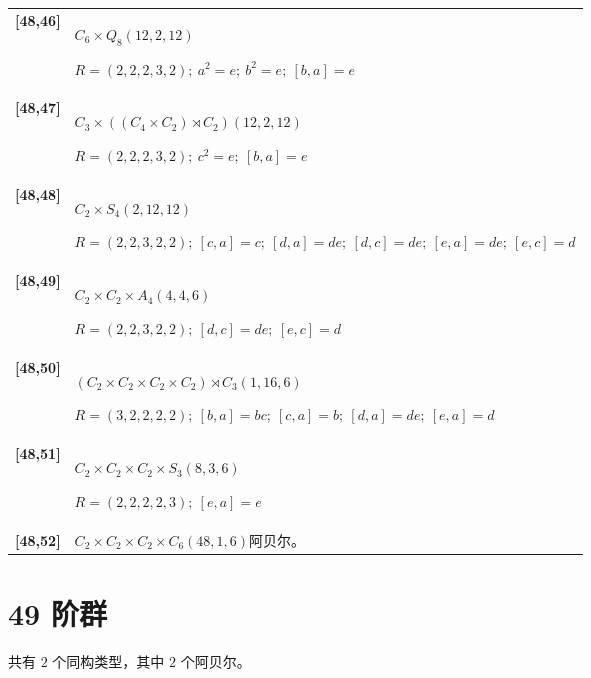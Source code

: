 \documentclass[UTF8,fontset=fandol,11pt,a4paper]{ctexart}
\begin{document}
\begin{longtable}{@{}p{17mm}>{\raggedright\arraybackslash}p{141mm}@{}}
\textbf{[48,46]} & $C_{6}\times Q_{8}$\quad $(12,2,12)$\par\(R=(2,2,2,3,2);\allowbreak\ a^{2}=e;\allowbreak\ b^{2}=e;\allowbreak\ [b,a]=e\)\\[3pt]

\textbf{[48,47]} & $C_{3}\times ((C_{4}\times C_{2})\rtimes C_{2})$\quad $(12,2,12)$\par\(R=(2,2,2,3,2);\allowbreak\ c^{2}=e;\allowbreak\ [b,a]=e\)\\[3pt]

\textbf{[48,48]} & $C_{2}\times S_{4}$\quad $(2,12,12)$\par\(R=(2,2,3,2,2);\allowbreak\ [c,a]=c;\allowbreak\ [d,a]=de;\allowbreak\ [d,c]=de;\allowbreak\ [e,a]=de;\allowbreak\ [e,c]=d\)\\[3pt]

\textbf{[48,49]} & $C_{2}\times C_{2}\times A_{4}$\quad $(4,4,6)$\par\(R=(2,2,3,2,2);\allowbreak\ [d,c]=de;\allowbreak\ [e,c]=d\)\\[3pt]

\textbf{[48,50]} & $(C_{2}\times C_{2}\times C_{2}\times C_{2})\rtimes C_{3}$\quad $(1,16,6)$\par\(R=(3,2,2,2,2);\allowbreak\ [b,a]=bc;\allowbreak\ [c,a]=b;\allowbreak\ [d,a]=de;\allowbreak\ [e,a]=d\)\\[3pt]

\textbf{[48,51]} & $C_{2}\times C_{2}\times C_{2}\times S_{3}$\quad $(8,3,6)$\par\(R=(2,2,2,2,3);\allowbreak\ [e,a]=e\)\\[3pt]

\textbf{[48,52]} & $C_{2}\times C_{2}\times C_{2}\times C_{6}$\quad $(48,1,6)$\quad 阿贝尔。\\[3pt]

\end{longtable}\endgroup

\section*{49 阶群}\label{order:49}

共有 $2$ 个同构类型，其中 $2$ 个阿贝尔。

\begingroup\small\setlength{\tabcolsep}{3pt}\renewcommand{\arraystretch}{1.12}
\end{document}
